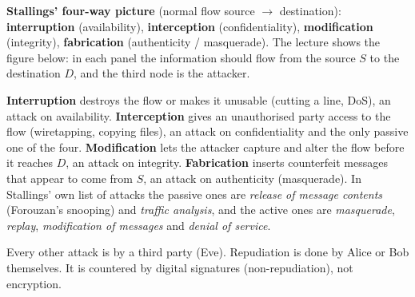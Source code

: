 \textbf{Stallings' four-way picture} (normal flow source $\to$ destination): \textbf{interruption} (availability), \textbf{interception} (confidentiality), \textbf{modification} (integrity), \textbf{fabrication} (authenticity / masquerade). The lecture shows the figure below: in each panel the information should flow from the source $S$ to the destination $D$, and the third node is the attacker.
\begin{center}
\end{center}
\textbf{Interruption} destroys the flow or makes it unusable (cutting a line, DoS), an attack on availability. \textbf{Interception} gives an unauthorised party access to the flow (wiretapping, copying files), an attack on confidentiality and the only passive one of the four. \textbf{Modification} lets the attacker capture and alter the flow before it reaches $D$, an attack on integrity. \textbf{Fabrication} inserts counterfeit messages that appear to come from $S$, an attack on authenticity (masquerade). In Stallings' own list of attacks the passive ones are \emph{release of message contents} (Forouzan's snooping) and \emph{traffic analysis}, and the active ones are \emph{masquerade}, \emph{replay}, \emph{modification of messages} and \emph{denial of service}.

\begin{trap}
Every other attack is by a third party (Eve). Repudiation is done by Alice or Bob themselves. It is countered by digital signatures (non-repudiation), not encryption.
\end{trap}

